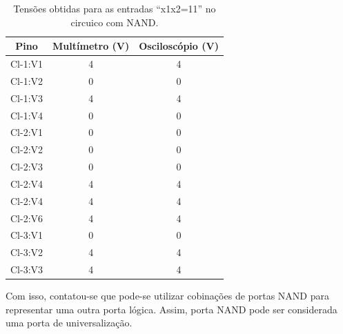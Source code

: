    \begin{table}[H]
	   \centering
	   \caption{Tensões obtidas para as entradas “x1x2=11” no circuico com NAND.}
	   \label{table:tabelaVerdade23}
	   \begin{tabular}{c|c|c}
		   \textbf{Pino} & \textbf{Multímetro (V)} & \textbf{Osciloscópio (V)}\\
		   \hline
		   Cl-1:V1 & 4 & 4 \\
		   Cl-1:V2 & 0 & 0 \\
		   Cl-1:V3 & 4 & 4 \\
		   Cl-1:V4 & 0 & 0 \\
		   \hline
		   Cl-2:V1 & 0 & 0 \\
		   Cl-2:V2 & 0 & 0 \\
		   Cl-2:V3 & 0 & 0 \\
		   Cl-2:V4 & 4 & 4 \\
		   Cl-2:V4 & 4 & 4 \\
		   Cl-2:V6 & 4 & 4 \\
		   \hline
		   Cl-3:V1 & 0 & 0 \\
		   Cl-3:V2 & 4 & 4 \\
		   Cl-3:V3 & 4 & 4 \\
	   \end{tabular}
   \end{table}

	Com isso, contatou-se que pode-se utilizar cobinações de portas NAND para representar uma outra porta lógica. Assim,
	porta NAND pode ser considerada uma porta de universalização.

